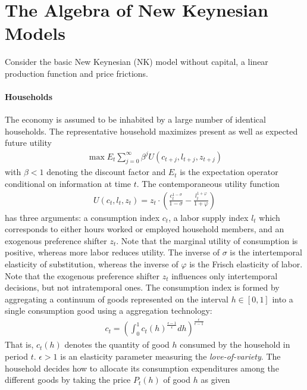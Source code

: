 \section[The Algebra of New Keynesian Models]{The Algebra of New Keynesian Models\label{ex:AlgebraNewKeynesianModels}}
Consider the basic New Keynesian (NK) model without capital, a linear production function and \textcite{Calvo_1983_StaggeredPricesUtilitymaximizing} price frictions.

\paragraph{Households} The economy is assumed to be inhabited by a large number of identical households.
The representative household maximizes present as well as expected future utility
\begin{align*}
\max E_t \sum_{j=0}^{\infty} \beta^{j} U(c_{t+j}, l_{t+j}, z_{t+j})
\end{align*}
with \(\beta <1\) denoting the discount factor and \(E_t\) is the expectation operator conditional on information at time \(t\).
The contemporaneous utility function 
\begin{align*}
U(c_t, l_t, z_t) = z_t \cdot \left( \frac{c_t^{1-\sigma}}{1-\sigma} - \frac{l_t^{1+\varphi}}{1+\varphi} \right)
\end{align*}
has three arguments: a consumption index \(c_t\), a labor supply index \(l_t\) which corresponds to either hours worked or employed household members,
  and an exogenous preference shifter \(z_t\).
Note that the marginal utility of consumption is positive, whereas more labor reduces utility.
The inverse of \(\sigma \) is the intertemporal elasticity of substitution,
  whereas the inverse of \(\varphi \) is the Frisch elasticity of labor.
Note that the exogenous preference shifter \(z_t\) influences only intertemporal decisions, but not intratemporal ones.
The consumption index is formed by aggregating a continuum of goods represented on the interval \(h\in [0,1]\)
  into a single consumption good using a \textcite{Dixit.Stiglitz_1977_MonopolisticCompetitionOptimum} aggregation technology:
\begin{align*}
	c_t = {\left(\int_0^1 c_t(h)^{\frac{\epsilon-1}{\epsilon}} dh \right)}^{\frac{\epsilon}{\epsilon-1}}
\end{align*}
That is, \(c_t(h)\) denotes the quantity of good \(h\) consumed by the household in period \(t\).
\(\epsilon>1\) is an elasticity parameter measuring the \emph{love-of-variety}.
The household decides how to allocate its consumption expenditures among the different goods by taking the price \(P_t(h)\) of good \(h\) as given
